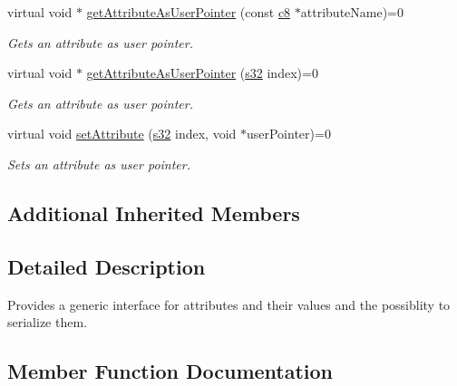 \begin{DoxyCompactItemize}
virtual void $\ast$ \hyperlink{classirr_1_1io_1_1IAttributes_a6f97e7af81f611bd13ced0378531ed2d}{get\+Attribute\+As\+User\+Pointer} (const \hyperlink{namespaceirr_a9395eaea339bcb546b319e9c96bf7410}{c8} $\ast$attribute\+Name)=0
\begin{DoxyCompactList}\small\item\em Gets an attribute as user pointer. \end{DoxyCompactList}\item 
virtual void $\ast$ \hyperlink{classirr_1_1io_1_1IAttributes_ae720da1bc66bc535ab839e95018d7398}{get\+Attribute\+As\+User\+Pointer} (\hyperlink{namespaceirr_ac66849b7a6ed16e30ebede579f9b47c6}{s32} index)=0
\begin{DoxyCompactList}\small\item\em Gets an attribute as user pointer. \end{DoxyCompactList}\item 
\mbox{\label{classirr_1_1io_1_1IAttributes_aacc6e6d6190d77651c5015ab4a911614}} 
virtual void \hyperlink{classirr_1_1io_1_1IAttributes_aacc6e6d6190d77651c5015ab4a911614}{set\+Attribute} (\hyperlink{namespaceirr_ac66849b7a6ed16e30ebede579f9b47c6}{s32} index, void $\ast$user\+Pointer)=0
\begin{DoxyCompactList}\small\item\em Sets an attribute as user pointer. \end{DoxyCompactList}\end{DoxyCompactItemize}
\subsection*{Additional Inherited Members}


\subsection{Detailed Description}
Provides a generic interface for attributes and their values and the possiblity to serialize them. 

\subsection{Member Function Documentation}
\mbox{\label{classirr_1_1io_1_1IAttributes_af4fb7e071a70bc0e9c57099bc04eda4f}} 
